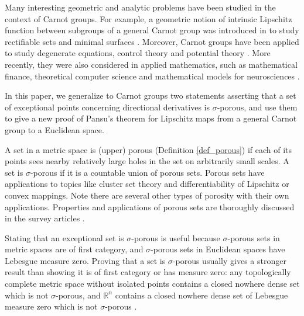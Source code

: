 \documentclass[reqno, 11pt]{amsart}
\theoremstyle{definition}
\theoremstyle{remark}
\numberwithin{theorem}{section}
\numberwithin{equation}{section}
\begin{document}
Many interesting geometric and analytic problems have been studied in the context of Carnot groups. For example, a geometric notion of intrinsic Lipschitz function between subgroups of a general Carnot group was introduced in \cite{FSC2} to study rectifiable sets \cite{FSSC2,Mag} and minimal surfaces \cite{CMPSC1,CMPSC2,SCV}. Moreover, Carnot groups have been applied to study degenerate equations, control theory and potential theory \cite{BLU}. More recently, they were also considered in applied mathematics, such as mathematical finance, theoretical computer science and  mathematical models for neurosciences \cite{CSP}.

In this paper, we generalize to Carnot groups two statements asserting that a set of exceptional points concerning directional derivatives is $\sigma$-porous, and use them to give a new proof of Pansu's theorem for Lipschitz maps from a general Carnot group to a Euclidean space.

A set in a metric space is (upper) porous (Definition \ref{def_porous}) if each of its points sees nearby relatively large holes in the set on arbitrarily small scales. A set is $\sigma$-porous if it is a countable union of porous sets. Porous sets have applications to topics like cluster set theory and differentiability of Lipschitz or convex mappings. Note there are several other types of porosity with their own applications. Properties and applications of porous sets are thoroughly discussed in the survey articles \cite{Zaj87, Zaj05}. 

Stating that an exceptional set is $\sigma$-porous is useful because $\sigma$-porous sets in metric spaces are of first category, and $\sigma$-porous sets in Euclidean spaces have Lebesgue measure zero. Proving that a set is $\sigma$-porous usually gives a stronger result than showing it is of first category or has measure zero: any topologically complete metric space without isolated points contains a closed nowhere dense set which is not $\sigma$-porous, and $\mathbb{R}^{n}$ contains a closed nowhere dense set of Lebesgue measure zero which is not $\sigma$-porous \cite{Zaj87}.
\end{document}
